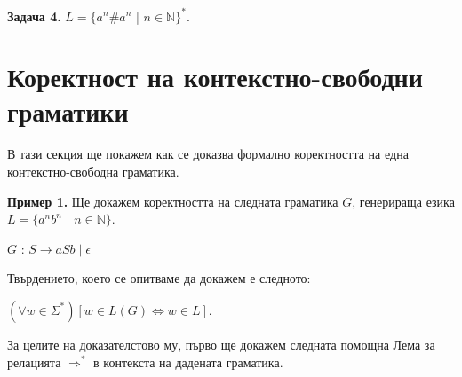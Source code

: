 \documentclass{article}
\begin{document}
    \textbf{Задача 4.} $L = \{a^n\#a^n$ | $n \in \mathbb{N}\}^*$.
\section{Коректност на контекстно-свободни граматики}

    \hspace{15pt} В тази секция ще покажем как се доказва формално коректността на
    една контекстно-свободна граматика. \\

    \vspace{15pt}

    \textbf{Пример 1.} Ще докажем коректността на следната граматика $G$, генерираща езика
    $L = \{a^nb^n$ | $n \in \mathbb{N}\}$. \\

    \begin{center}
    
       $G$ : $\boxed{S \rightarrow aSb \; | \; \epsilon}$
        
    \end{center}
    
    \vspace{5pt}

    \hspace{5pt} Твърдението, което се опитваме да докажем е следното: \\

    \begin{center}
        $(\forall w \in \Sigma^*)[w \in L(G) \iff w \in L]$.
    \end{center}

    За целите на доказателстово му, първо ще докажем следната помощна Лема за релацията
    $\Rightarrow^*$ в контекста на дадената граматика. \\

    \vspace{5pt}
\end{document}

